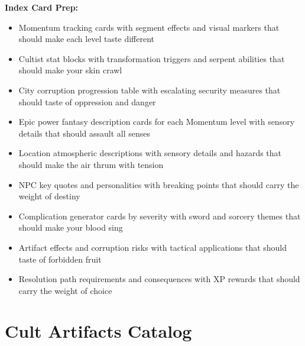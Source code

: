 \documentclass[11pt]{article}
\begin{document}
\textbf{Index Card Prep:}
\begin{itemize}
\item Momentum tracking cards with segment effects and visual markers that should make each level taste different
\item Cultist stat blocks with transformation triggers and serpent abilities that should make your skin crawl
\item City corruption progression table with escalating security measures that should taste of oppression and danger
\item Epic power fantasy description cards for each Momentum level with sensory details that should assault all senses
\item Location atmospheric descriptions with sensory details and hazards that should make the air thrum with tension
\item NPC key quotes and personalities with breaking points that should carry the weight of destiny
\item Complication generator cards by severity with sword and sorcery themes that should make your blood sing
\item Artifact effects and corruption risks with tactical applications that should taste of forbidden fruit
\item Resolution path requirements and consequences with XP rewards that should carry the weight of choice
\end{itemize}

\section{Cult Artifacts Catalog}
\end{document}
